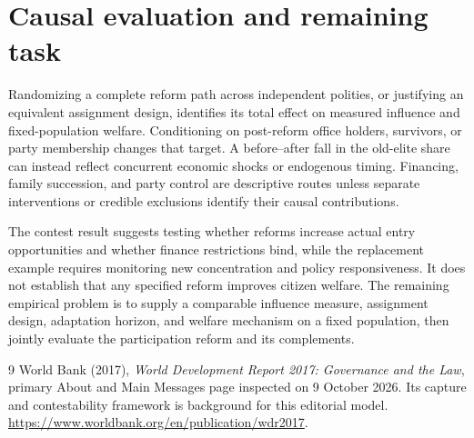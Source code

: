 \documentclass[11pt]{article}
\begin{document}
\section*{Causal evaluation and remaining task}
Randomizing a complete reform path across independent polities, or justifying an equivalent assignment design, identifies its total effect on measured influence and fixed-population welfare. Conditioning on post-reform office holders, survivors, or party membership changes that target. A before--after fall in the old-elite share can instead reflect concurrent economic shocks or endogenous timing. Financing, family succession, and party control are descriptive routes unless separate interventions or credible exclusions identify their causal contributions.

The contest result suggests testing whether reforms increase actual entry opportunities and whether finance restrictions bind, while the replacement example requires monitoring new concentration and policy responsiveness. It does not establish that any specified reform improves citizen welfare. The remaining empirical problem is to supply a comparable influence measure, assignment design, adaptation horizon, and welfare mechanism on a fixed population, then jointly evaluate the participation reform and its complements.

\begin{thebibliography}{9}
 World Bank (2017), \emph{World Development Report 2017: Governance and the Law}, primary About and Main Messages page inspected on 9 October 2026. Its capture and contestability framework is background for this editorial model. \url{https://www.worldbank.org/en/publication/wdr2017}.
\end{thebibliography}
\end{document}
